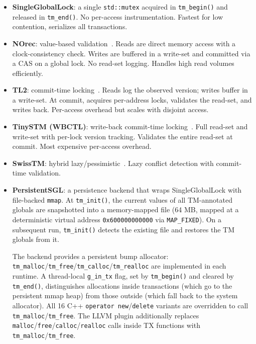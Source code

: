 \documentclass[article,12pt]{article}
\begin{document}
\begin{itemize}
\item \textbf{SingleGlobalLock}: a single \texttt{std::mutex} acquired in
  \texttt{tm\_begin()} and released in \texttt{tm\_end()}.  No per-access
  instrumentation.  Fastest for low contention, serializes all transactions.
\item \textbf{NOrec}: value-based validation~\cite{NOrec}.  Reads are direct
  memory access with a clock-consistency check.  Writes are buffered in a
  write-set and committed via a CAS on a global lock.  No read-set logging.
  Handles high read volumes efficiently.
\item \textbf{TL2}: commit-time locking~\cite{TL2}.  Reads log the observed
  version; writes buffer in a write-set.  At commit, acquires per-address
  locks, validates the read-set, and writes back.  Per-access overhead but
  scales with disjoint access.
\item \textbf{TinySTM (WBCTL)}: write-back commit-time locking~\cite{TinySTM}.
  Full read-set and write-set with per-lock version tracking.  Validates
  the entire read-set at commit.  Most expensive per-access overhead.
\item \textbf{SwissTM}: hybrid lazy/pessimistic~\cite{SwissTM}.  Lazy conflict
  detection with commit-time validation.
\item \textbf{PersistentSGL}: a persistence backend that wraps
  SingleGlobalLock with file-backed \texttt{mmap}.  At
  \texttt{tm\_init()}, the current values of all TM-annotated globals are
  snapshotted into a memory-mapped file (64 MB, mapped at a deterministic
  virtual address \texttt{0x600000000000} via \texttt{MAP\_FIXED}).
  On a subsequent run, \texttt{tm\_init()} detects the existing file and
  restores the TM globals from it.

  The backend provides a persistent bump allocator:
  \texttt{tm\_malloc}/\texttt{tm\_free}/\texttt{tm\_calloc}/\texttt{tm\_realloc}
  are implemented in each runtime.  A thread-local \texttt{g\_in\_tx} flag,
  set by \texttt{tm\_begin()} and cleared by \texttt{tm\_end()}, distinguishes
  allocations inside transactions (which go to the persistent mmap heap) from
  those outside (which fall back to the system allocator).
  All 16 C++ \texttt{operator new}/\texttt{delete} variants are overridden to
  call \texttt{tm\_malloc}/\texttt{tm\_free}.  The LLVM plugin additionally
  replaces \texttt{malloc}/\texttt{free}/\texttt{calloc}/\texttt{realloc}
  calls inside TX functions with \texttt{tm\_malloc}/\texttt{tm\_free}.


\end{itemize}
\end{document}
